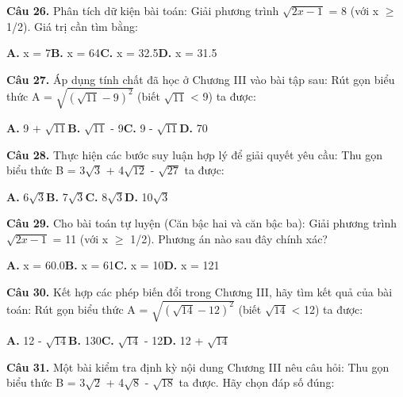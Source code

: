 \documentclass[11pt,a4paper]{article}
\begin{document}
\textbf{\color{primary} Câu 26.} Phân tích dữ kiện bài toán: Giải phương trình $\sqrt{2x - 1}$ = 8 (với x $\ge$ 1/2). Giá trị cần tìm bằng:\par
\hspace*{1.5em}\textbf{A.} x = 7\quad\quad \textbf{B.} x = 64\quad\quad \textbf{C.} x = 32.5\quad\quad \textbf{D.} x = 31.5\par\vspace{2pt}
\textbf{\color{primary} Câu 27.} Áp dụng tính chất đã học ở Chương III vào bài tập sau: Rút gọn biểu thức A = $\sqrt{(\sqrt{11} - 9)^2}$ (biết $\sqrt{11}$ < 9) ta được:\par
\hspace*{1.5em}\textbf{A.} 9 + $\sqrt{11}$\quad\quad \textbf{B.} $\sqrt{11}$ - 9\quad\quad \textbf{C.} 9 - $\sqrt{11}$\quad\quad \textbf{D.} 70\par\vspace{2pt}
\textbf{\color{primary} Câu 28.} Thực hiện các bước suy luận hợp lý để giải quyết yêu cầu: Thu gọn biểu thức B = 3$\sqrt{3}$ + 4$\sqrt{12}$ - $\sqrt{27}$ ta được:\par
\hspace*{1.5em}\textbf{A.} 6$\sqrt{3}$\quad\quad \textbf{B.} 7$\sqrt{3}$\quad\quad \textbf{C.} 8$\sqrt{3}$\quad\quad \textbf{D.} 10$\sqrt{3}$\par\vspace{2pt}
\textbf{\color{primary} Câu 29.} Cho bài toán tự luyện (Căn bậc hai và căn bậc ba): Giải phương trình $\sqrt{2x - 1}$ = 11 (với x $\ge$ 1/2). Phương án nào sau đây chính xác?\par
\hspace*{1.5em}\textbf{A.} x = 60.0\quad\quad \textbf{B.} x = 61\quad\quad \textbf{C.} x = 10\quad\quad \textbf{D.} x = 121\par\vspace{2pt}
\textbf{\color{primary} Câu 30.} Kết hợp các phép biến đổi trong Chương III, hãy tìm kết quả của bài toán: Rút gọn biểu thức A = $\sqrt{(\sqrt{14} - 12)^2}$ (biết $\sqrt{14}$ < 12) ta được:\par
\hspace*{1.5em}\textbf{A.} 12 - $\sqrt{14}$\quad\quad \textbf{B.} 130\quad\quad \textbf{C.} $\sqrt{14}$ - 12\quad\quad \textbf{D.} 12 + $\sqrt{14}$\par\vspace{2pt}
\textbf{\color{primary} Câu 31.} Một bài kiểm tra định kỳ nội dung Chương III nêu câu hỏi: Thu gọn biểu thức B = 3$\sqrt{2}$ + 4$\sqrt{8}$ - $\sqrt{18}$ ta được. Hãy chọn đáp số đúng:\par
\end{document}
